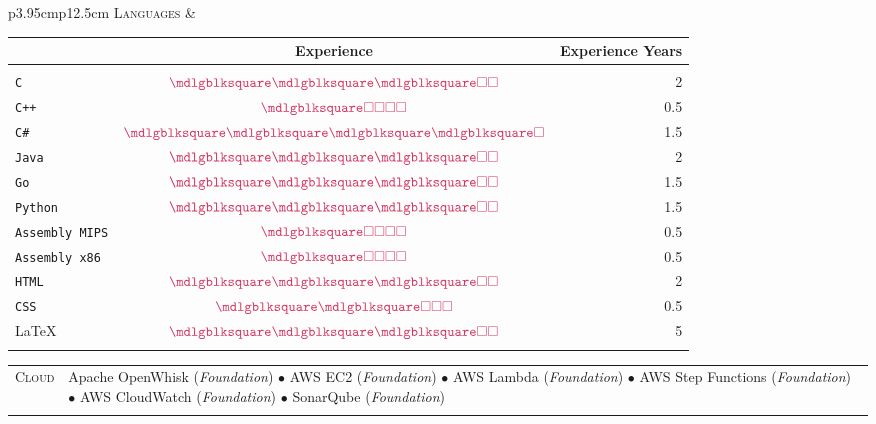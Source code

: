 \documentclass[english,10pt,a4paper]{article}
\newcommand{\BasicLevel}{{\footnotesize (\textit{Foundation})}}
\newcommand{\CvBullet}{\hspace{0.05cm} \textcolor{CvColor}{$\bullet$} \hspace{0.05cm}}
\newcommand{\CvDate}[1]{\textcolor{CvColor}{{\textsc{#1}}}}
\newcommand{\FullBlock}{\textcolor{CvColor}{\mdlgblksquare}}
\newcommand{\EmptyBlock}{\textcolor{CvColor}{\square}}
\def\SidebarHSize{3.95cm}
\def\BodyHSize{12.5cm}
\begin{document}
		\begin{tabular}{p{\SidebarHSize}p{\BodyHSize}}
			\CvDate{Languages} &  \begin{tabular}{lcr}
				\centering
				& \textbf{Experience} & \textbf{Experience Years} \\
				\hline
				&& \\
				\texttt{C} & $\FullBlock\FullBlock\FullBlock\EmptyBlock\EmptyBlock$ & 2 \\
				\texttt{C++} & $\FullBlock\EmptyBlock\EmptyBlock\EmptyBlock\EmptyBlock$ & 0.5 \\
				\texttt{C\#} & $\FullBlock\FullBlock\FullBlock\FullBlock\EmptyBlock$ & 1.5 \\
				\texttt{Java} & $\FullBlock\FullBlock\FullBlock\EmptyBlock\EmptyBlock$ & 2 \\
				\texttt{Go} & $\FullBlock\FullBlock\FullBlock\EmptyBlock\EmptyBlock$ & 1.5 \\
				\texttt{Python} & $\FullBlock\FullBlock\FullBlock\EmptyBlock\EmptyBlock$ & 1.5 \\
				\texttt{Assembly MIPS} & $\FullBlock\EmptyBlock\EmptyBlock\EmptyBlock\EmptyBlock$ & 0.5 \\
				\texttt{Assembly x86} & $\FullBlock\EmptyBlock\EmptyBlock\EmptyBlock\EmptyBlock$ & 0.5 \\
				\texttt{HTML} & $\FullBlock\FullBlock\FullBlock\EmptyBlock\EmptyBlock$ & 2 \\
				\texttt{CSS} & $\FullBlock\FullBlock\EmptyBlock\EmptyBlock\EmptyBlock$ & 0.5 \\
				\LaTeX & $\FullBlock\FullBlock\FullBlock\EmptyBlock\EmptyBlock$ & 5 \\\\
			\end{tabular}
		\end{tabular}
		
		\begin{tabular}{p{\SidebarHSize}p{\BodyHSize}}
			\CvDate{Cloud} & Apache OpenWhisk \BasicLevel \CvBullet AWS EC2 \BasicLevel \CvBullet AWS Lambda  \BasicLevel \CvBullet AWS Step Functions \BasicLevel \CvBullet AWS CloudWatch \BasicLevel \CvBullet SonarQube \BasicLevel \\\\
		\end{tabular}
		
\end{document}
